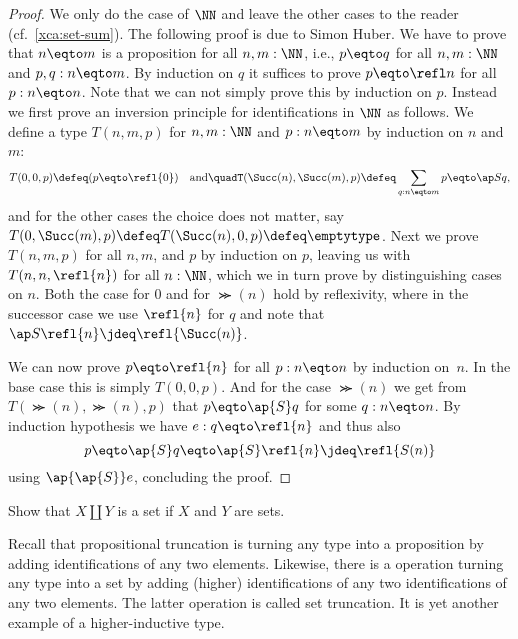 \begin{proof}
  We only do the case of $\NN$ and leave the other cases to the reader
  (cf.\ \cref{xca:set-sum}). The following proof is due to Simon Huber.
  We have to prove that $n \eqto m$ is a
  proposition for all $n,m:\NN$, i.e., $p \eqto q$ for all $n,m : \NN$ and
  $p, q : n \eqto m$.  By induction on $q$ it suffices to prove $p \eqto \refl
  n$ for all $p : n \eqto n$.  Note that we can not simply prove this by
  induction on $p$.  Instead we first prove an inversion principle for
  identifications in $\NN$ as follows.  We define a type $T(n,m,p)$
  for $n, m : \NN$ and $p : n \eqto m$ by induction on $n$ and $m$:
  \[
    T(0,0,p) \defeq (p \eqto \refl{0})%
    \quad \text{and} \quad%
    T(\Succ(n), \Succ(m), p) \defeq \sum_{q : n \eqto m} p \eqto \ap S q,%
  \]
  and for the other cases the choice does not matter, say $T(0, \Succ(m),
  p) \defeq T(\Succ(n), 0 ,p) \defeq \emptytype$.  Next we prove $T(n,m,p)$
  for all $n,m$, and $p$ by induction on $p$, leaving us with
  $T(n,n,\refl{n})$ for all $n : \NN$, which we in turn prove by
  distinguishing cases on $n$.  Both the case for $0$ and for $\Succ(n)$
  hold by reflexivity, where in the successor case we use $\refl{n}$
  for $q$ and note that $\ap S \refl{n} \jdeq \refl{\Succ(n)}$.

  We can now prove $p \eqto \refl{n}$ for all $p : n \eqto n$ by induction
  on~$n$.  In the base case this is simply $T(0,0,p)$.  And for the
  case $\Succ(n)$ we get from $T(\Succ(n),\Succ(n),p)$ that $p \eqto \ap{S} q$ for
  some $q : n \eqto n$.  By induction hypothesis we have $e : q \eqto 
  \refl{n}$ and thus also
  \[
    p \eqto \ap{S} q \eqto \ap{S} \refl{n} \jdeq \refl{S (n)}
  \]
  using $\ap{\ap{S}} e$, concluding the proof.
\end{proof}

\begin{xca}\label{xca:set-sum}
Show that $X\amalg Y$ is a set if $X$ and $Y$ are sets.
\end{xca}

Recall that propositional truncation is turning any type into
a proposition by adding identifications of any two elements.
Likewise, there is a operation turning any type into a set
by adding (higher) identifications of any two identifications
of any two elements. The latter operation is called set truncation.
It is yet another example of a higher-inductive type.

